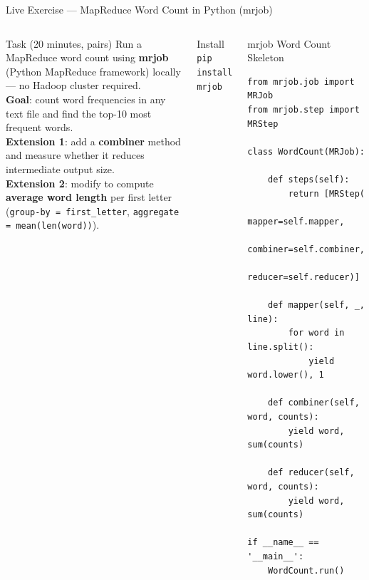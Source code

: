 \documentclass[aspectratio=169,10pt]{beamer}
\begin{document}
\begin{frame}[fragile]{Live Exercise — MapReduce Word Count in Python (mrjob)}
  \begin{columns}[T]
      \begin{block}{Task (20 minutes, pairs)}
        Run a MapReduce word count using
        \textbf{mrjob} (Python MapReduce framework)
        locally — no Hadoop cluster required.\\[5pt]
        \textbf{Goal}: count word frequencies in any text file
        and find the top-10 most frequent words.\\[5pt]
        \textbf{Extension 1}: add a \textbf{combiner} method
        and measure whether it reduces intermediate output size.\\[5pt]
        \textbf{Extension 2}: modify to compute
        \textbf{average word length} per first letter
        (\texttt{group-by = first\_letter},
        \texttt{aggregate = mean(len(word))}).
      \end{block}
      \vspace{4pt}
      \begin{exampleblock}{Install}
        \texttt{\scriptsize pip install mrjob}
      \end{exampleblock}

      \begin{exampleblock}{mrjob Word Count Skeleton}
        \scriptsize
        \begin{verbatim}
from mrjob.job import MRJob
from mrjob.step import MRStep

class WordCount(MRJob):

    def steps(self):
        return [MRStep(
            mapper=self.mapper,
            combiner=self.combiner,
            reducer=self.reducer)]

    def mapper(self, _, line):
        for word in line.split():
            yield word.lower(), 1

    def combiner(self, word, counts):
        yield word, sum(counts)

    def reducer(self, word, counts):
        yield word, sum(counts)

if __name__ == '__main__':
    WordCount.run()
        \end{verbatim}
      \end{exampleblock}
  \end{columns}
\end{frame}
\end{document}
